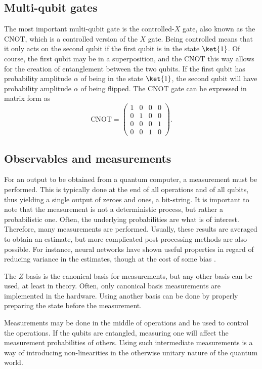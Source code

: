 \subsection{Multi-qubit gates}
The most important multi-qubit gate is the controlled-$X$ gate, also known as the CNOT, which is a controlled version of the $X$ gate.
Being controlled means that it only acts on the second qubit if the first qubit is in the state $\ket{1}$.
Of course, the first qubit may be in a superposition, and the CNOT this way allows for the creation of entanglement between the two qubits.
If the first qubit has probability amplitude $\alpha$ of being in the state $\ket{1}$, the second qubit will have probability amplitude $\alpha$ of being flipped.
The CNOT gate can be expressed in matrix form as
\begin{equation}
    \text{CNOT} = \begin{pmatrix} 1 & 0 & 0 & 0 \\ 0 & 1 & 0 & 0 \\ 0 & 0 & 0 & 1 \\ 0 & 0 & 1 & 0 \end{pmatrix}.
\end{equation}

\subsection{Observables and measurements}
For an output to be obtained from a quantum computer, a measurement must be performed.
This is typically done at the end of all operations and of all qubits, thus yielding a single output of zeroes and ones, a bit-string.
It is important to note that the measurement is not a deterministic process, but rather a probabilistic one.
Often, the underlying probabilities are what is of interest.
Therefore, many measurements are performed.
Usually, these results are averaged to obtain an estimate, but more complicated post-processing methods are also possible.
For instance, neural networks have shown useful properties in regard of reducing variance in the estimates, though at the cost of some bias \cite{torlai2020}.

The $Z$ basis is the canonical basis for measurements, but any other basis can be used, at least in theory.
Often, only canonical basis measurements are implemented in the hardware.
Using another basis can be done by properly preparing the state before the measurement.

Measurements may be done in the middle of operations and be used to control the operations.
If the qubits are entangled, measuring one will affect the measurement probabilities of others.
Using such intermediate measurements is a way of introducing non-linearities in the otherwise unitary nature of the quantum world.


